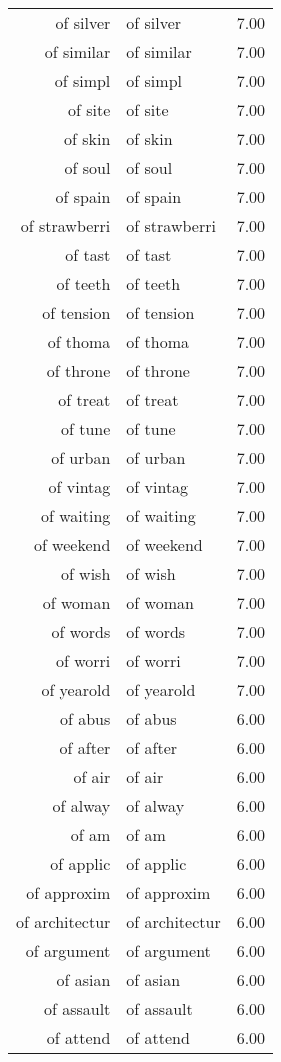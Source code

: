 \begin{table}[ht]
\begin{tabular}{rlr}
  of silver & of silver & 7.00 \\ 
  of similar & of similar & 7.00 \\ 
  of simpl & of simpl & 7.00 \\ 
  of site & of site & 7.00 \\ 
  of skin & of skin & 7.00 \\ 
  of soul & of soul & 7.00 \\ 
  of spain & of spain & 7.00 \\ 
  of strawberri & of strawberri & 7.00 \\ 
  of tast & of tast & 7.00 \\ 
  of teeth & of teeth & 7.00 \\ 
  of tension & of tension & 7.00 \\ 
  of thoma & of thoma & 7.00 \\ 
  of throne & of throne & 7.00 \\ 
  of treat & of treat & 7.00 \\ 
  of tune & of tune & 7.00 \\ 
  of urban & of urban & 7.00 \\ 
  of vintag & of vintag & 7.00 \\ 
  of waiting & of waiting & 7.00 \\ 
  of weekend & of weekend & 7.00 \\ 
  of wish & of wish & 7.00 \\ 
  of woman & of woman & 7.00 \\ 
  of words & of words & 7.00 \\ 
  of worri & of worri & 7.00 \\ 
  of yearold & of yearold & 7.00 \\ 
  of abus & of abus & 6.00 \\ 
  of after & of after & 6.00 \\ 
  of air & of air & 6.00 \\ 
  of alway & of alway & 6.00 \\ 
  of am & of am & 6.00 \\ 
  of applic & of applic & 6.00 \\ 
  of approxim & of approxim & 6.00 \\ 
  of architectur & of architectur & 6.00 \\ 
  of argument & of argument & 6.00 \\ 
  of asian & of asian & 6.00 \\ 
  of assault & of assault & 6.00 \\ 
  of attend & of attend & 6.00 \\ 

\end{tabular}
\end{table}
